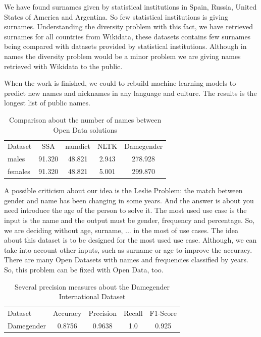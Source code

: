 \documentclass[a4paper]{article}
\begin{document}
We have found surnames given by statistical institutions in Spain,
Russia, United States of America and Argentina. So few statistical
institutions is giving surnames. Understanding the diversity problem
with this fact, we have retrieved surnames for all countries from
Wikidata, these datasets contains few surnames being compared with
datasets provided by statistical institutions. Although in names the
diversity problem would be a minor problem we are giving names
retrieved with Wikidata to the public.

When the work is finished, we could to rebuild machine learning models
to predict new names and nicknames in any language and culture. The
results is the longest list of public names.

\begin{table}[t]
\footnotesize
\begin{tabular}[]{lcccc}
  \hline
  Dataset & SSA & namdict & NLTK & Damegender \tabularnewline
  males & 91.320 & 48.821 & 2.943 & 278.928 \tabularnewline
  females & 91.320 & 48.821 & 5.001 & 299.870 \tabularnewline
  \hline
\end{tabular}
\caption{Comparison about the number of names between Open Data solutions}
\label{table:DifferentNamesMeasures}
\end{table}

A possible criticism about our idea is the Leslie
Problem\cite{blevins2015jane}: the match between gender and name has
been changing in some years. And the answer is about you need
introduce the age of the person to solve it. The most used use case is
the input is the name and the output must be gender, frequency and
percentage. So, we are deciding without age, surname, ... in the most
of use cases. The idea about this dataset is to be designed for the
most used use case. Although, we can take into account other inputs,
such as surname or age to improve the accuracy. There are many Open
Datasets with names and frequencies classified by years. So, this
problem can be fixed with Open Data, too.

\begin{table}[t]
\footnotesize
\begin{tabular}[]{lcccc}
  \hline
  Dataset  & Accuracy & Precision & Recall & F1-Score  \tabularnewline
  Damegender &  0.8756  & 0.9638    & 1.0    & 0.925  \tabularnewline
  \hline
\end{tabular}
\caption{Several precision measures about the Damegender International Dataset}
\label{table:DifferentAccuracyMeasures}
\end{table}
\end{document}
